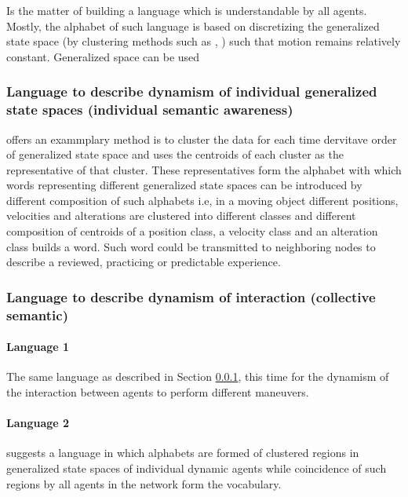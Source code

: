 \documentclass{article}
\begin{document}
			Is the matter of building a language which is understandable by all agents. Mostly, the alphabet of such language is based on discretizing the generalized state space (by clustering methods such as \cite{fiser-2013-growing-neural-gas-efficiently}, \cite{kohonen-2001-self-organizing-maps}) such that motion remains relatively constant. Generalized space can be used  
			
			\subsubsection{Language to describe dynamism of individual generalized state spaces (individual semantic awareness)} \label{sec:individual-semantic-awareness}
				\cite{kanapram-2019-self-awareness-in-intelligent-vehicles-experience-based-abnormality-detection} offers an exammplary method is to cluster the data for each time dervitave order of generalized state space and uses the centroids of each cluster as the representative of that cluster. These representatives form the alphabet with which words representing different generalized state spaces can be introduced by different composition of such alphabets i.e, in a moving object different positions, velocities and alterations are clustered into different classes and different composition of centroids of a position class, a velocity class and an alteration class builds a word. Such word could be transmitted to neighboring nodes to describe a reviewed, practicing or predictable experience.
			\subsubsection{Language to describe dynamism of interaction (collective semantic)} \label{sec:collective-semantic-awareness}
				\paragraph{Language 1}
				The same language as described in Section \ref{sec:individual-semantic-awareness}, this time for the dynamism of the interaction between agents to perform different maneuvers. 
				\paragraph{Language 2}
				\cite{baydoun-2019-prediction-of-multi-target-dynamics-using-discrete-descriptors-an-interactive-approach} suggests a language in which alphabets are formed of clustered regions in generalized state spaces of individual dynamic agents while coincidence of such regions by all agents in the network form the vocabulary.  
			
\end{document}
